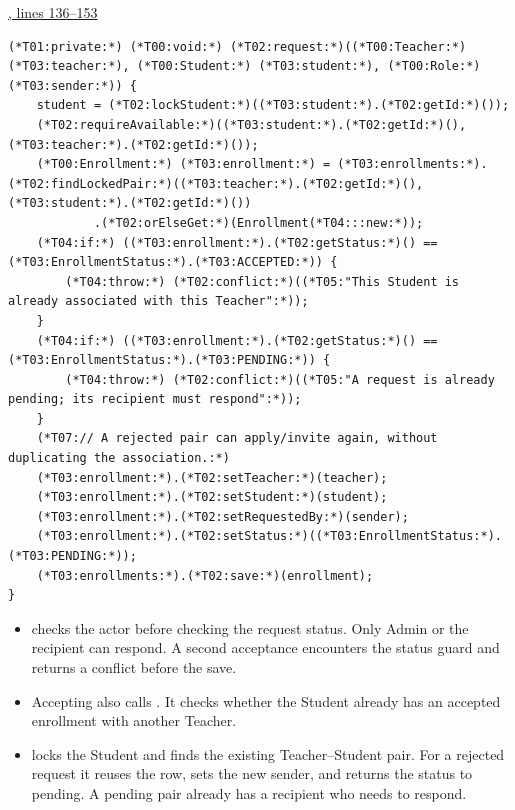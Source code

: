 \par\smallskip
{\small\href{\repo/blob/5d22aed7f6d4ef1e4c0b0c0dabf2962ba4b47608/src/main/java/com/example/fmschool/service/EnrollmentService.java#L136-L153}{, lines 136--153}}
\begin{lstlisting}[style=vsJava,firstnumber=136]
(*T01:private:*) (*T00:void:*) (*T02:request:*)((*T00:Teacher:*) (*T03:teacher:*), (*T00:Student:*) (*T03:student:*), (*T00:Role:*) (*T03:sender:*)) {
    student = (*T02:lockStudent:*)((*T03:student:*).(*T02:getId:*)());
    (*T02:requireAvailable:*)((*T03:student:*).(*T02:getId:*)(), (*T03:teacher:*).(*T02:getId:*)());
    (*T00:Enrollment:*) (*T03:enrollment:*) = (*T03:enrollments:*).(*T02:findLockedPair:*)((*T03:teacher:*).(*T02:getId:*)(), (*T03:student:*).(*T02:getId:*)())
            .(*T02:orElseGet:*)(Enrollment(*T04:::new:*));
    (*T04:if:*) ((*T03:enrollment:*).(*T02:getStatus:*)() == (*T03:EnrollmentStatus:*).(*T03:ACCEPTED:*)) {
        (*T04:throw:*) (*T02:conflict:*)((*T05:"This Student is already associated with this Teacher":*));
    }
    (*T04:if:*) ((*T03:enrollment:*).(*T02:getStatus:*)() == (*T03:EnrollmentStatus:*).(*T03:PENDING:*)) {
        (*T04:throw:*) (*T02:conflict:*)((*T05:"A request is already pending; its recipient must respond":*));
    }
    (*T07:// A rejected pair can apply/invite again, without duplicating the association.:*)
    (*T03:enrollment:*).(*T02:setTeacher:*)(teacher);
    (*T03:enrollment:*).(*T02:setStudent:*)(student);
    (*T03:enrollment:*).(*T02:setRequestedBy:*)(sender);
    (*T03:enrollment:*).(*T02:setStatus:*)((*T03:EnrollmentStatus:*).(*T03:PENDING:*));
    (*T03:enrollments:*).(*T02:save:*)(enrollment);
}
\end{lstlisting}


\begin{itemize}
\item {} checks the actor before checking the request status. Only Admin
or the recipient can respond. A second acceptance encounters the status guard
and returns a conflict before the save.
\item Accepting also calls . It checks whether the Student
already has an accepted enrollment with another Teacher.
\item {} locks the Student and finds the existing Teacher--Student pair.
For a rejected request it reuses the row, sets the new sender, and returns the
status to pending. A pending pair already has a recipient who needs to respond.
\end{itemize}

